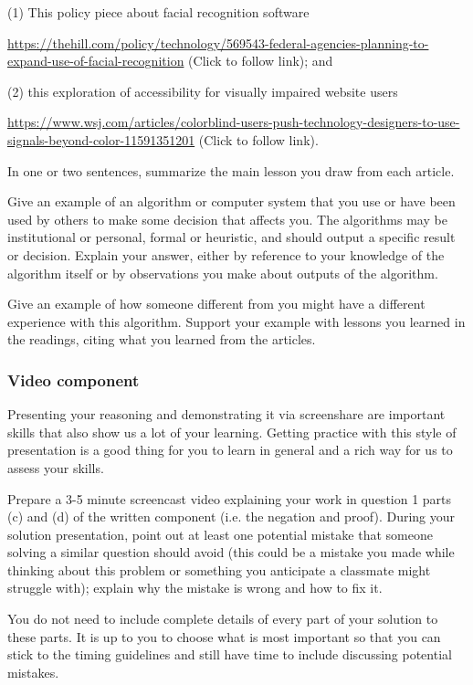 \documentclass[12pt, oneside]{article}
\begin{document}
\begin{enumerate}
    (1) This policy piece about facial recognition software

    {\tiny \url{https://thehill.com/policy/technology/569543-federal-agencies-planning-to-expand-use-of-facial-recognition}}
    (Click to follow link); and 

    (2) this exploration of accessibility for visually impaired website users
    
    {\tiny \url{https://www.wsj.com/articles/colorblind-users-push-technology-designers-to-use-signals-beyond-color-11591351201}}
    (Click to follow link).

    In one or two sentences, summarize the main lesson you draw from each article.

    Give an example of an algorithm or computer system that you use or have been used by others to 
    make some decision that affects you. The algorithms may be institutional or personal, formal or 
    heuristic, and should output a 
    specific result or decision. Explain your answer, either by reference to your knowledge of 
    the algorithm itself or by observations you make 
    about outputs of the algorithm.

    Give an example of how someone different from you might have a different experience 
    with this algorithm. Support your example with lessons you learned in the 
    readings, citing what you learned from the articles.
\end{enumerate}

\subsubsection*{Video component}
Presenting your reasoning and demonstrating it via screenshare are important skills that 
also show us a lot of your learning. Getting practice with this style of presentation 
is a good thing for you to learn in general and a rich way for us to assess your skills. 

Prepare a 3-5 minute screencast video explaining your work in question 1 parts (c) and (d)
of the written component (i.e. the negation and proof).
During your solution presentation, point out at least one potential mistake that someone 
solving a similar question should avoid (this could be a mistake you made while thinking 
about this problem or something you anticipate a classmate might struggle with); 
explain why the mistake is wrong and how to fix it. 

You do not need to include complete details of every part of your solution to these parts. 
It is up to you to choose what is most important so that you can stick to the 
timing guidelines and still have time to include discussing potential mistakes.
\end{document}
